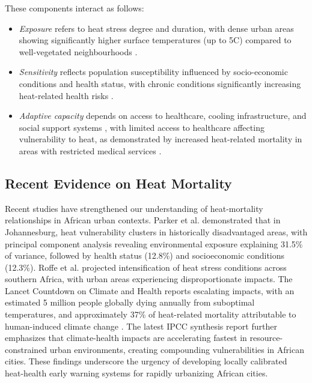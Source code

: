These components interact as follows:
\begin{itemize}
    \item \textit{Exposure} refers to heat stress degree and duration, with dense urban areas showing significantly higher surface temperatures (up to 5\textdegree C) compared to well-vegetated neighbourhoods \citep{Li2017, Santamouris2015}.
    
    \item \textit{Sensitivity} reflects population susceptibility influenced by socio-economic conditions and health status, with chronic conditions significantly increasing heat-related health risks \citep{Watts2023, Khosla2021, Souverijns2022}.
    
    \item \textit{Adaptive capacity} depends on access to healthcare, cooling infrastructure, and social support systems \citep{Ansah2024}, with limited access to healthcare affecting vulnerability to heat, as demonstrated by increased heat-related mortality in areas with restricted medical services \citep{Murage2020}.
\end{itemize}

\subsection{Recent Evidence on Heat Mortality}
Recent studies have strengthened our understanding of heat-mortality relationships in African urban contexts. Parker et al. \citep{Parker2023} demonstrated that in Johannesburg, heat vulnerability clusters in historically disadvantaged areas, with principal component analysis revealing environmental exposure explaining 31.5\% of variance, followed by health status (12.8\%) and socioeconomic conditions (12.3\%). Roffe et al. \citep{Roffe2023} projected intensification of heat stress conditions across southern Africa, with urban areas experiencing disproportionate impacts. The Lancet Countdown on Climate and Health \citep{Romanello2023} reports escalating impacts, with an estimated 5 million people globally dying annually from suboptimal temperatures, and approximately 37\% of heat-related mortality attributable to human-induced climate change \citep{Lancet2024}. The latest IPCC synthesis report \citep{IPCC2024} further emphasizes that climate-health impacts are accelerating fastest in resource-constrained urban environments, creating compounding vulnerabilities in African cities. These findings underscore the urgency of developing locally calibrated heat-health early warning systems for rapidly urbanizing African cities.

